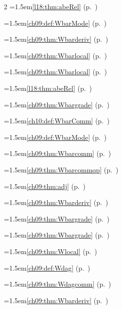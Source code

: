 \begin{multicols}{2}
\hangindent=1.5em\quad \ref{l18:thm:abeRel} (p.~\pageref{l18:thm:abeRel})\par
\hangindent=1.5em\quad \ref{ch09:def:WbarMode} (p.~\pageref{ch09:def:WbarMode})\par
\hangindent=1.5em\quad \ref{ch09:thm:Wbarderiv} (p.~\pageref{ch09:thm:Wbarderiv})\par
\hangindent=1.5em\quad \ref{ch09:thm:Wbarlocal} (p.~\pageref{ch09:thm:Wbarlocal})\par
\hangindent=1.5em\quad \ref{ch09:thm:Wbarlocal} (p.~\pageref{ch09:thm:Wbarlocal})\par
\hangindent=1.5em\quad \ref{l18:thm:abeRel} (p.~\pageref{l18:thm:abeRel})\par
\hangindent=1.5em\quad \ref{ch09:thm:Wbargrade} (p.~\pageref{ch09:thm:Wbargrade})\par
\hangindent=1.5em\quad \ref{ch10:def:WbarComm} (p.~\pageref{ch10:def:WbarComm})\par
\hangindent=1.5em\quad \ref{ch09:def:WbarMode} (p.~\pageref{ch09:def:WbarMode})\par
\hangindent=1.5em\quad \ref{ch09:thm:Wbarcomm} (p.~\pageref{ch09:thm:Wbarcomm})\par
\hangindent=1.5em\quad \ref{ch09:thm:Wbarcommqp} (p.~\pageref{ch09:thm:Wbarcommqp})\par
\hangindent=1.5em\quad \ref{ch09:thm:adj} (p.~\pageref{ch09:thm:adj})\par
\hangindent=1.5em\quad \ref{ch09:thm:Wbarderiv} (p.~\pageref{ch09:thm:Wbarderiv})\par
\hangindent=1.5em\quad \ref{ch09:thm:Wbargrade} (p.~\pageref{ch09:thm:Wbargrade})\par
\hangindent=1.5em\quad \ref{ch09:thm:Wbargrade} (p.~\pageref{ch09:thm:Wbargrade})\par
\hangindent=1.5em\quad \ref{ch09:thm:Wlocal} (p.~\pageref{ch09:thm:Wlocal})\par
\hangindent=1.5em\quad \ref{ch09:def:Wdag} (p.~\pageref{ch09:def:Wdag})\par
\hangindent=1.5em\quad \ref{ch09:thm:Wdagcomm} (p.~\pageref{ch09:thm:Wdagcomm})\par
\hangindent=1.5em\quad \ref{ch09:thm:Wbarderiv} (p.~\pageref{ch09:thm:Wbarderiv})\par

\end{multicols}

